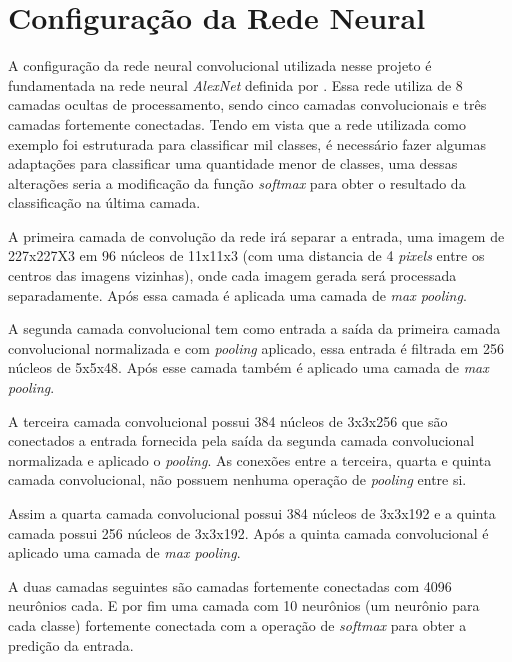 


\section{Configuração da Rede Neural}

A configuração da rede neural convolucional utilizada nesse projeto é fundamentada na rede neural \textit{AlexNet} definida por . Essa rede utiliza de 8 camadas ocultas de processamento, sendo cinco camadas convolucionais e três camadas fortemente conectadas. Tendo em vista que a rede utilizada como exemplo foi estruturada para classificar mil classes, é necessário fazer algumas adaptações para classificar uma quantidade menor de classes, uma dessas alterações seria a modificação da função \textit{softmax} para obter o resultado da classificação na última camada.
\par A primeira camada de convolução da rede irá separar a entrada, uma imagem de 227x227X3 em 96 núcleos de 11x11x3 (com uma distancia de 4 \textit{pixels} entre os centros das imagens vizinhas), onde cada imagem gerada será processada separadamente. Após essa camada é aplicada uma camada de \textit{max pooling}.
\par A segunda camada convolucional tem como entrada a saída da primeira camada convolucional normalizada e com \textit{pooling} aplicado, essa entrada é filtrada em 256 núcleos de 5x5x48. Após esse camada também é aplicado uma camada de \textit{max pooling}.
\par A terceira camada convolucional possui 384 núcleos de 3x3x256 que são conectados a entrada fornecida pela saída da segunda camada convolucional normalizada e aplicado o \textit{pooling}. As conexões entre a terceira, quarta e quinta camada convolucional, não possuem nenhuma operação de \textit{pooling} entre si. 
\par Assim a quarta camada convolucional possui 384 núcleos de 3x3x192 e a quinta camada possui 256 núcleos de 3x3x192. Após a quinta camada convolucional é aplicado uma camada de \textit{max pooling}.
\par A duas camadas seguintes são camadas fortemente conectadas com 4096 neurônios cada. E por fim uma camada com 10 neurônios (um neurônio para cada classe) fortemente conectada com a operação de \textit{softmax} para obter a predição da entrada.


